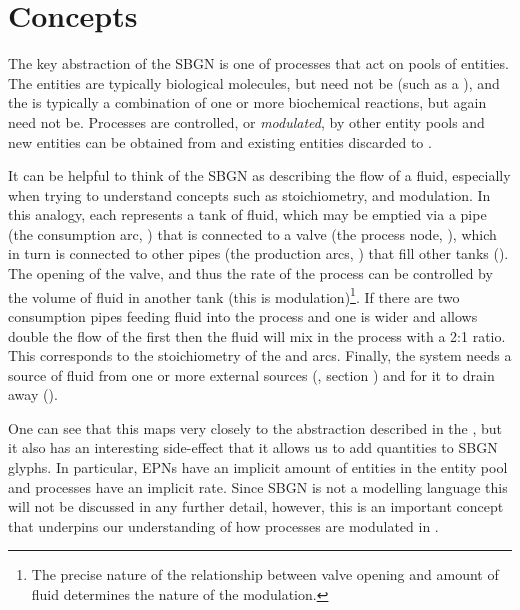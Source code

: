 \section{Concepts}
\label{sec:concepts}

The key abstraction of the SBGN \PDl is one of  processes that act on pools of entities. The entities are typically biological molecules, but need not be (such as a ), and the  is typically a combination of one or more  biochemical reactions, but again need not be.
Processes are controlled, or \emph{modulated}, by other entity pools and new entities can be obtained from  and existing entities discarded to .

It can be helpful to think of the SBGN \PD as describing the flow of a fluid, especially when trying to understand concepts such as stoichiometry, and modulation. In this analogy, each  represents a tank of fluid, which may be emptied via a pipe (the consumption arc, ) that is connected to a valve (the process node, ), which in turn is connected to other pipes (the production arcs, ) that fill other tanks (). The opening of the valve, and thus the rate of the process can be controlled by the volume of fluid in another tank (this is modulation)\footnote{The precise nature of the relationship between valve opening and amount of fluid determines the nature of the modulation.}. If there are two consumption pipes feeding fluid into the process and one is wider and allows double the flow of the first then the fluid will mix in the process with a 2:1 ratio. This corresponds to the stoichiometry of the  and  arcs. Finally, the system needs a source of fluid from one or more external sources (,  section ) and  for it to drain away ().

One can see that this maps very closely to the abstraction described in the \PDl, but it also has an interesting side-effect that it allows us to add quantities to SBGN glyphs. In particular, EPNs have an implicit amount of entities in the entity pool and processes have an implicit rate. Since SBGN \PD is not a modelling language this will not be discussed in any further detail, however, this is an important concept that underpins our understanding of how processes are modulated in .

